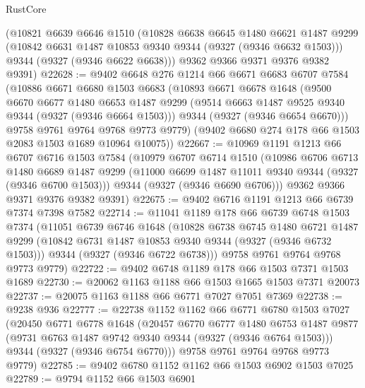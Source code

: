 \begin{lexlean}{RustCore}
\begin{coremodule}
    (@10821
      @6639
      @6646
      @1510
      (@10828
        @6638
        @6645
        @1480
        @6621
        @1487
        @9299
        (@10842 @6631 @1487 @10853 @9340 @9344 (@9327 (@9346 @6632 @1503)))
        @9344
        (@9327 (@9346 @6622 @6638)))
      @9362
      @9366
      @9371
      @9376
      @9382
      @9391)
@22628 := @9402
    @6648
    @276
    @1214
    @66
    @6671
    @6683
    @6707
    @7584
    (@10886
      @6671
      @6680
      @1503
      @6683
      (@10893
        @6671
        @6678
        @1648
        (@9500
          @6670
          @6677
          @1480
          @6653
          @1487
          @9299
          (@9514 @6663 @1487 @9525 @9340 @9344 (@9327 (@9346 @6664 @1503)))
          @9344
          (@9327 (@9346 @6654 @6670)))
        @9758
        @9761
        @9764
        @9768
        @9773
        @9779)
      (@9402 @6680 @274 @178 @66 @1503 @2083 @1503 @1689 @10964 @10075))
@22667 := @10969
    @1191
    @1213
    @66
    @6707
    @6716
    @1503
    @7584
    (@10979
      @6707
      @6714
      @1510
      (@10986
        @6706
        @6713
        @1480
        @6689
        @1487
        @9299
        (@11000 @6699 @1487 @11011 @9340 @9344 (@9327 (@9346 @6700 @1503)))
        @9344
        (@9327 (@9346 @6690 @6706)))
      @9362
      @9366
      @9371
      @9376
      @9382
      @9391)
@22675 := @9402 @6716 @1191 @1213 @66 @6739 @7374 @7398 @7582
@22714 := @11041
    @1189
    @178
    @66
    @6739
    @6748
    @1503
    @7374
    (@11051
      @6739
      @6746
      @1648
      (@10828
        @6738
        @6745
        @1480
        @6721
        @1487
        @9299
        (@10842 @6731 @1487 @10853 @9340 @9344 (@9327 (@9346 @6732 @1503)))
        @9344
        (@9327 (@9346 @6722 @6738)))
      @9758
      @9761
      @9764
      @9768
      @9773
      @9779)
@22722 := @9402 @6748 @1189 @178 @66 @1503 @7371 @1503 @1689
@22730 := @20062 @1163 @1188 @66 @1503 @1665 @1503 @7371 @20073
@22737 := @20075 @1163 @1188 @66 @6771 @7027 @7051 @7369
@22738 := @9238 @936
@22777 := @22738
    @1152
    @1162
    @66
    @6771
    @6780
    @1503
    @7027
    (@20450
      @6771
      @6778
      @1648
      (@20457
        @6770
        @6777
        @1480
        @6753
        @1487
        @9877
        (@9731 @6763 @1487 @9742 @9340 @9344 (@9327 (@9346 @6764 @1503)))
        @9344
        (@9327 (@9346 @6754 @6770)))
      @9758
      @9761
      @9764
      @9768
      @9773
      @9779)
@22785 := @9402 @6780 @1152 @1162 @66 @1503 @6902 @1503 @7025
@22789 := @9794 @1152 @66 @1503 @6901

\end{coremodule}
\end{lexlean}
